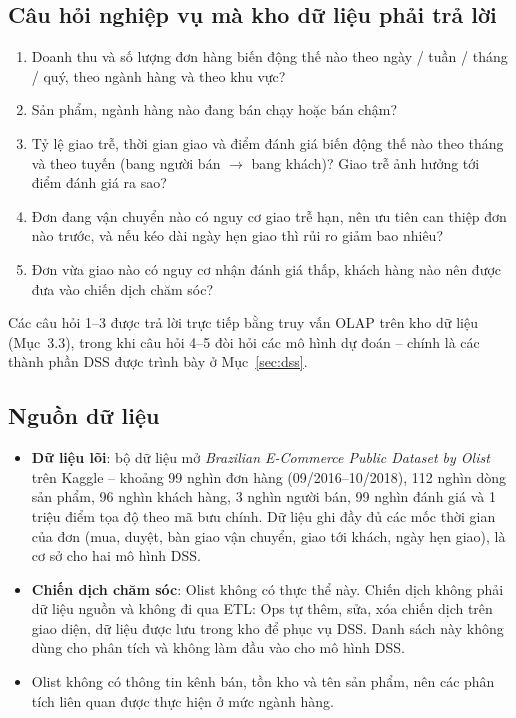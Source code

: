 \subsection{Câu hỏi nghiệp vụ mà kho dữ liệu phải trả lời}
\begin{enumerate}
    \item Doanh thu và số lượng đơn hàng biến động thế nào theo ngày / tuần / tháng / quý,
          theo ngành hàng và theo khu vực?
    \item Sản phẩm, ngành hàng nào đang bán chạy hoặc bán chậm?
    \item Tỷ lệ giao trễ, thời gian giao và điểm đánh giá biến động thế nào theo tháng và theo
          tuyến (bang người bán $\to$ bang khách)? Giao trễ ảnh hưởng tới điểm đánh giá ra sao?
    \item Đơn đang vận chuyển nào có nguy cơ giao trễ hạn, nên ưu tiên can thiệp đơn nào trước,
          và nếu kéo dài ngày hẹn giao thì rủi ro giảm bao nhiêu?
    \item Đơn vừa giao nào có nguy cơ nhận đánh giá thấp, khách hàng nào nên được đưa vào chiến
          dịch chăm sóc?
\end{enumerate}
Các câu hỏi 1--3 được trả lời trực tiếp bằng truy vấn OLAP trên kho dữ liệu (Mục~3.3),
trong khi câu hỏi 4--5 đòi hỏi các mô hình dự đoán -- chính là các thành phần DSS được trình
bày ở Mục~\ref{sec:dss}.

\subsection{Nguồn dữ liệu}
\begin{itemize}
    \item \textbf{Dữ liệu lõi}: bộ dữ liệu mở \textit{Brazilian E-Commerce Public Dataset by
          Olist} trên Kaggle -- khoảng 99 nghìn đơn hàng (09/2016--10/2018), 112 nghìn dòng sản
          phẩm, 96 nghìn khách hàng, 3 nghìn người bán, 99 nghìn đánh giá và 1 triệu điểm tọa độ
          theo mã bưu chính. Dữ liệu ghi đầy đủ các mốc thời gian của đơn (mua, duyệt, bàn giao
          vận chuyển, giao tới khách, ngày hẹn giao), là cơ sở cho hai mô hình DSS.
    \item \textbf{Chiến dịch chăm sóc}: Olist không có thực thể này. Chiến dịch không phải dữ
          liệu nguồn và không đi qua ETL: Ops tự thêm, sửa, xóa chiến dịch trên giao diện, dữ liệu
          được lưu trong kho để phục vụ DSS. Danh sách này không dùng cho phân tích và không làm
          đầu vào cho mô hình DSS.
    \item Olist không có thông tin kênh bán, tồn kho và tên sản phẩm, nên các phân tích liên
          quan được thực hiện ở mức ngành hàng.
\end{itemize}

